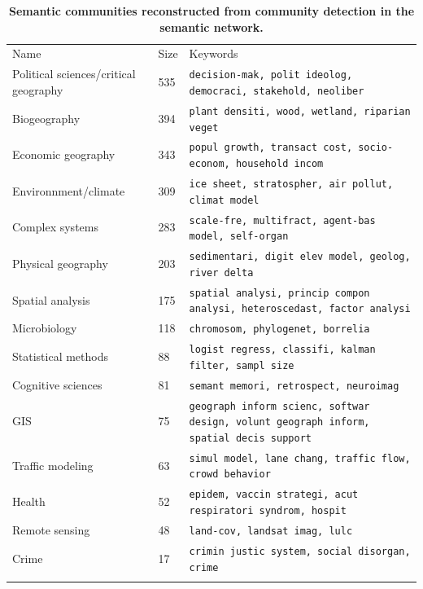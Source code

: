 \begin{table}
\caption{\textbf{Semantic communities reconstructed from community detection in the semantic network.}}
\label{tab:domains}
\hspace{-2cm}
\begin{tabular}{lll}
\hline\noalign{\smallskip}
Name & Size & Keywords  \\
\noalign{\smallskip}\hline\noalign{\smallskip}
Political sciences/critical geography & 535 & \texttt{decision-mak, polit ideolog, democraci, stakehold, neoliber} \\
Biogeography & 394 & \texttt{plant densiti, wood, wetland, riparian veget} \\
Economic geography & 343 &  \texttt{popul growth, transact cost, socio-econom, household incom} \\
Environnment/climate & 309 & \texttt{ice sheet, stratospher, air pollut, climat model} \\
Complex systems & 283 & \texttt{scale-fre, multifract, agent-bas model, self-organ} \\
Physical geography & 203 & \texttt{sedimentari, digit elev model, geolog, river delta} \\
Spatial analysis & 175 & \texttt{spatial analysi, princip compon analysi, heteroscedast, factor analysi} \\
Microbiology & 118 & \texttt{chromosom, phylogenet, borrelia} \\
Statistical methods & 88 & \texttt{logist regress, classifi, kalman filter, sampl size} \\
Cognitive sciences & 81 & \texttt{semant memori, retrospect, neuroimag} \\
GIS & 75 & \texttt{geograph inform scienc, softwar design, volunt geograph inform, spatial decis support} \\
Traffic modeling & 63 & \texttt{simul model, lane chang, traffic flow, crowd behavior} \\
Health & 52 & \texttt{epidem, vaccin strategi, acut respiratori syndrom, hospit} \\
Remote sensing & 48 & \texttt{land-cov, landsat imag, lulc} \\
Crime & 17 & \texttt{crimin justic system, social disorgan, crime} \\
\noalign{\smallskip}\hline
\end{tabular}
\end{table}


